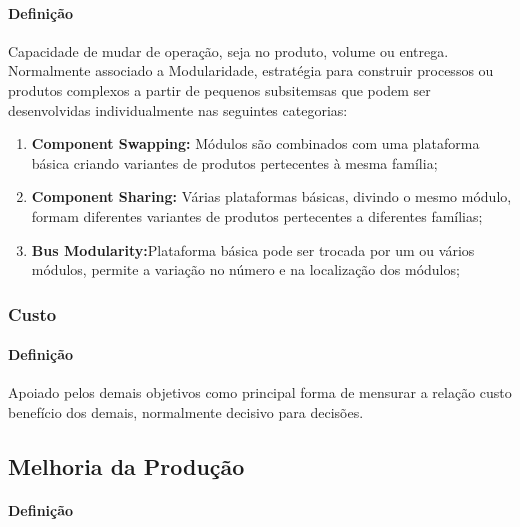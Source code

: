 \documentclass{article}
\begin{document}
                \paragraph{Definição}Capacidade de mudar de operação, seja no produto, volume ou entrega. Normalmente associado a Modularidade, estratégia para construir processos ou produtos complexos a partir de pequenos subsitemsas que podem ser desenvolvidas individualmente nas seguintes categorias:
                    \begin{enumerate}[rightmargin = \leftmargin]
                        \item \textbf{Component Swapping:} Módulos são combinados com uma plataforma básica criando variantes de produtos pertecentes à mesma família;

                        \item \textbf{Component Sharing:} Várias plataformas básicas, divindo o mesmo módulo, formam diferentes variantes de produtos pertecentes a diferentes famílias;

                        \item \textbf{Bus Modularity:}Plataforma básica pode ser trocada por um ou vários módulos, permite a variação no número e na localização dos módulos;
                    \end{enumerate}

            \subsubsection{Custo}
                \paragraph{Definição}Apoiado pelos demais objetivos como principal forma de mensurar a relação custo benefício dos demais, normalmente decisivo para decisões.

        \subsection{Melhoria da Produção}
            \paragraph{Definição} 
\end{document}
